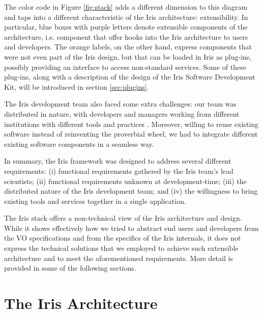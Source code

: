 \documentclass[final,5p]{elsarticle}
\begin{document}
The color code in Figure \ref{fig:stack} adds a different dimension to this diagram and taps into a different characteristic of the Iris architecture: extensibility. In particular, blue boxes with purple letters denote extensible components of the architecture, i.e. component that offer hooks into the Iris architecture to users and developers. The orange labels, on the other hand, express components that were not even part of the Iris design, but that can be loaded in Iris as plug-ins, possibly providing an interface to access non-standard services. Some of these plug-ins, along with a description of the design of the Iris Software Development Kit, will be introduced in section \ref{sec:plugins}.

The Iris development team also faced some extra challenges: our team was distributed in nature, with developers and managers working from different institutions with different tools and practices \citep{2012SPIE.8449E..0IE}. Moreover, willing to reuse existing software instead of reinventing the proverbial wheel, we had to integrate different existing software components in a seamless way.

In summary, the Iris framework was designed to address several different requirements: (i) functional requirements gathered by the Iris team's lead scientists; (ii) functional requirements unknown at development-time; (iii) the distributed nature of the Iris development team; and (iv) the willingness to bring existing tools and services together in a single application.

The Iris stack offers a non-technical view of the Iris architecture and design. While it shows effectively how we tried to abstract end users and developers from the VO specifications and from the specifics of the Iris internals, it does not express the technical solutions that we employed to achieve such extensible architecture and to meet the aforementioned requirements. More detail is provided in some of the following sections.



\section{The Iris Architecture}
\label{sec:architecture}
\end{document}
